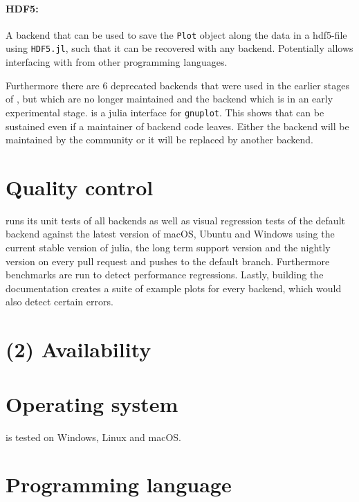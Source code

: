 \documentclass[a4paper]{article}
\begin{document}
\paragraph{HDF5:}
A backend that can be used to save the \texttt{Plot} object along the data in a hdf5-file using \texttt{HDF5.jl}\cite{HomeHDF5Jl}, such that it can be recovered with any backend.
Potentially allows interfacing with \Plots from other programming languages.

\vspace{1em}
Furthermore there are 6 deprecated backends that were used in the earlier stages of \Plots, but which are no longer maintained and the  backend which is in an early experimental stage.
 is a julia interface for \texttt{gnuplot}\cite{GnuplotHomepage}.
This shows that \Plots can be sustained even if a maintainer of backend code leaves.
Either the backend will be maintained by the community or it will be replaced by another backend.


\section*{Quality control}


\Plots runs its unit tests of all backends as well as visual regression tests of the default backend against the latest version of macOS, Ubuntu and Windows using the current stable version of julia, the long term support version and the nightly version on every pull request and pushes to the default branch.
Furthermore benchmarks are run to detect performance regressions.
Lastly, building the documentation creates a suite of example plots for every backend, which would also detect certain errors.

\section*{(2) Availability}
\vspace{0.5cm}
\section*{Operating system}

\Plots is tested on Windows, Linux and macOS.


\section*{Programming language}
\end{document}

